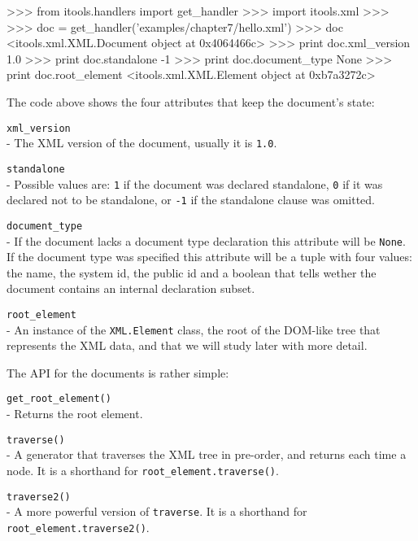 \begin{code}
    >>> from itools.handlers import get_handler
    >>> import itools.xml
    >>>
    >>> doc = get_handler('examples/chapter7/hello.xml')
    >>> doc
    <itools.xml.XML.Document object at 0x4064466c>
    >>> print doc.xml_version
    1.0
    >>> print doc.standalone 
    -1
    >>> print doc.document_type
    None
    >>> print doc.root_element
    <itools.xml.XML.Element object at 0xb7a3272c>
\end{code}

The code above shows the four attributes that keep the document's state:

\begin{api}
    {\tt xml\_version}\\
    - The XML version of the document, usually it is {\tt 1.0}.

    {\tt standalone}\\
    - Possible values are: {\tt 1} if the document was declared standalone,
      {\tt 0} if it was declared not to be standalone, or {\tt -1} if the
      standalone clause was omitted.

    {\tt document\_type}\\
    - If the document lacks a document type declaration this attribute will
      be {\tt None}. If the document type was specified this attribute will
      be a tuple with four values: the name, the system id, the public id
      and a boolean that tells wether the document contains an internal
      declaration subset.

    {\tt root\_element}\\
    - An instance of the {\tt XML.Element} class, the root of the DOM-like
      tree that represents the XML data, and that we will study later with
      more detail.
\end{api}


The API for the documents is rather simple:

\begin{api}
    {\tt get\_root\_element()}\\
    - Returns the root element.

    {\tt traverse()}\\
    - A generator that traverses the XML tree in pre-order, and returns
      each time a node. It is a shorthand for {\tt root\_element.traverse()}.

    {\tt traverse2()}\\
    - A more powerful version of {\tt traverse}. It is a shorthand for
      {\tt root\_element.traverse2()}.
\end{api}


